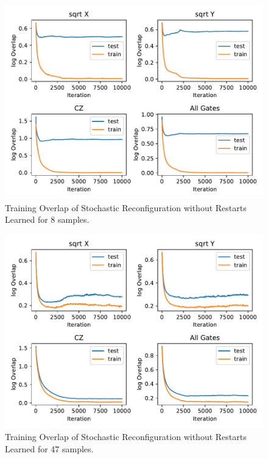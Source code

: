 \begin{figure}[H]
  \centering
  \includegraphics[width=\textwidth]{figures/results/SR-no-restarts-learned/avgOverlap_8.pdf}
  \caption[Training Overlap of Stochastic Reconfiguration without Restarts Learned]{Training 
  Overlap of Stochastic Reconfiguration without Restarts Learned for 8 samples.}
  \label{fig:sr_tvd}
\end{figure}

\begin{figure}[H]
  \centering
  \includegraphics[width=\textwidth]{figures/results/SR-no-restarts-learned/avgOverlap_47.pdf}
  \caption[Training Overlap of Stochastic Reconfiguration without Restarts Learned]{Training 
  Overlap of Stochastic Reconfiguration without Restarts Learned for 47 samples.}
  \label{fig:sr_tvd}
\end{figure}

